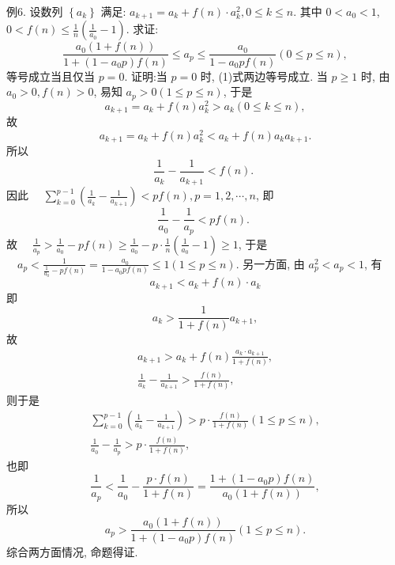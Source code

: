 例6. 设数列 $\left\{a_k\right\}$ 满足: $a_{k+1}=a_k+f(n) \cdot a_k^2, 0 \leqslant k \leqslant n$. 其中 $0<a_0<1$, $0<f(n) \leqslant \frac{1}{n}\left(\frac{1}{a_0}-1\right)$. 求证:
$$
\frac{a_0(1+f(n))}{1+\left(1-a_0 p\right) f(n)} \leqslant a_p \leqslant \frac{a_0}{1-a_0 p f(n)}(0 \leqslant p \leqslant n), \label{(1)}
$$
等号成立当且仅当 $p=0$.
证明:当 $p=0$ 时, (1)式两边等号成立.
当 $p \geqslant 1$ 时, 由 $a_0>0, f(n)>0$, 易知 $a_p>0(1 \leqslant p \leqslant n)$, 于是
$$
a_{k+1}=a_k+f(n) a_k^2>a_k(0 \leqslant k \leqslant n),
$$
故
$$
a_{k+1}=a_k+f(n) a_k^2<a_k+f(n) a_k a_{k+1} .
$$
所以
$$
\frac{1}{a_k}-\frac{1}{a_{k+1}}<f(n) \text {. }
$$
因此 $\quad \sum_{k=0}^{p-1}\left(\frac{1}{a_k}-\frac{1}{a_{k+1}}\right)<p f(n), p=1,2, \cdots, n$,
即
$$
\frac{1}{a_0}-\frac{1}{a_p}<p f(n) \text {. }
$$
故 $\quad \frac{1}{a_p}>\frac{1}{a_0}-p f(n) \geqslant \frac{1}{a_0}-p \cdot \frac{1}{n}\left(\frac{1}{a_0}-1\right) \geqslant 1$,
于是 $\quad a_p<\frac{1}{\frac{1}{a_0}-p f(n)}=\frac{a_0}{1-a_0 p f(n)} \leqslant 1(1 \leqslant p \leqslant n)$.
另一方面, 由 $a_p^2<a_p<1$, 有
$$
a_{k+1}<a_k+f(n) \cdot a_k
$$
即
$$
a_k>\frac{1}{1+f(n)} a_{k+1},
$$
故
$$
\begin{gathered}
a_{k+1}>a_k+f(n) \frac{a_k \cdot a_{k+1}}{1+f(n)}, \\
\frac{1}{a_k}-\frac{1}{a_{k+1}}>\frac{f(n)}{1+f(n)},
\end{gathered}
$$
则于是
$$
\begin{gathered}
\sum_{k=0}^{p-1}\left(\frac{1}{a_k}-\frac{1}{a_{k+1}}\right)>p \cdot \frac{f(n)}{1+f(n)}(1 \leqslant p \leqslant n), \\
\frac{1}{a_0}-\frac{1}{a_p}>p \cdot \frac{f(n)}{1+f(n)},
\end{gathered}
$$
也即
$$
\frac{1}{a_p}<\frac{1}{a_0}-\frac{p \cdot f(n)}{1+f(n)}=\frac{1+\left(1-a_0 p\right) f(n)}{a_0(1+f(n))},
$$
所以
$$
a_p>\frac{a_0(1+f(n))}{1+\left(1-a_0 p\right) f(n)}(1 \leqslant p \leqslant n) .
$$
综合两方面情况, 命题得证.



